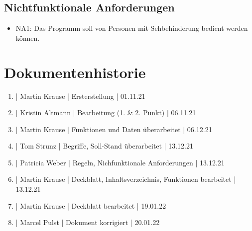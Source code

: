 \documentclass[12pt]{scrartcl}
\begin{document}
\subsection{Nichtfunktionale Anforderungen}

\begin{itemize}
	\item NA1: Das Programm soll von Personen mit Sehbehinderung bedient werden können.
\end{itemize}

\section{Dokumentenhistorie}

\begin{enumerate}
	\item | Martin Krause | Ersterstellung | 01.11.21
	\item | Kristin Altmann | Bearbeitung (1. \& 2. Punkt) | 06.11.21
	\item | Martin Krause | Funktionen und Daten überarbeitet | 06.12.21
	\item | Tom Strunz | Begriffe, Soll-Stand überarbeitet | 13.12.21
	\item | Patricia Weber | Regeln, Nichfunktionale Anforderungen | 13.12.21
	\item | Martin Krause | Deckblatt, Inhaltsverzeichnis, Funktionen bearbeitet | 13.12.21
	\item | Martin Krause | Deckblatt bearbeitet | 19.01.22
	\item | Marcel Pulst | Dokument korrigiert | 20.01.22
\end{enumerate}
 
\end{document}
